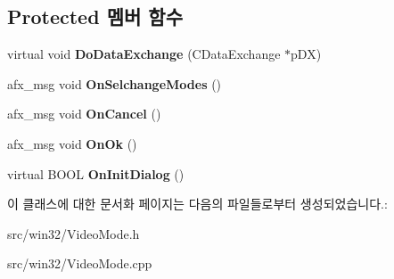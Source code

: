 \subsection*{Protected 멤버 함수}
\begin{DoxyCompactItemize}
\item 
\mbox{\label{class_video_mode_a1ba1890dc2533e494de5f16ce05e59c5}} 
virtual void {\bfseries Do\+Data\+Exchange} (C\+Data\+Exchange $\ast$p\+DX)
\item 
\mbox{\label{class_video_mode_a8f9eece36c71ae9f171d53bf0cce9c68}} 
afx\+\_\+msg void {\bfseries On\+Selchange\+Modes} ()
\item 
\mbox{\label{class_video_mode_ad50575dec1b43e682cdf94a998a5bc1a}} 
afx\+\_\+msg void {\bfseries On\+Cancel} ()
\item 
\mbox{\label{class_video_mode_af9bcacc26657ea8610ae926f14fc648e}} 
afx\+\_\+msg void {\bfseries On\+Ok} ()
\item 
\mbox{\label{class_video_mode_acb6a1c86e30e641be5e8d7f904547deb}} 
virtual B\+O\+OL {\bfseries On\+Init\+Dialog} ()
\end{DoxyCompactItemize}


이 클래스에 대한 문서화 페이지는 다음의 파일들로부터 생성되었습니다.\+:\begin{DoxyCompactItemize}
\item 
src/win32/Video\+Mode.\+h\item 
src/win32/Video\+Mode.\+cpp\end{DoxyCompactItemize}
